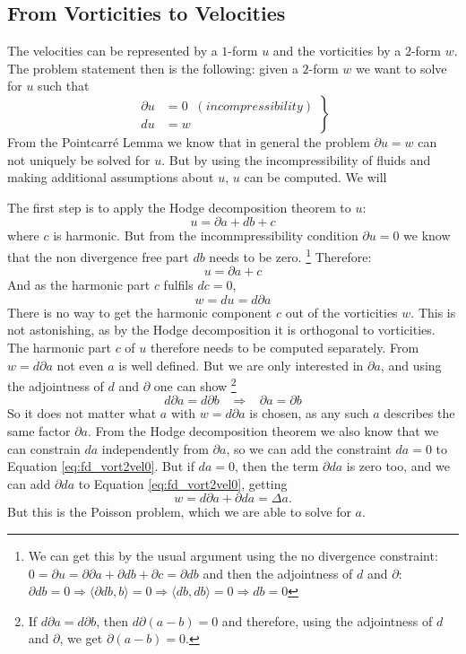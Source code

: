 \subsection{From Vorticities to Velocities}
\label{subsec:fd_vort2vel}
The velocities can be represented by a $1$-form $u$ and the vorticities by a $2$-form $w$.
 The problem statement then is the following: given a $2$-form $w$ we want to solve for $u$ such that
\begin{equation*}\left.\begin{aligned}\partial u &= 0 \;\; (incompressibility) \\ 
du &= w \end{aligned}\right\}\end{equation*}
From the Pointcarr\'e Lemma we know that   in general  the problem $\partial u = w$ can not uniquely be solved for $u$. But by using the incompressibility of fluids and making additional assumptions about $u$, $u$ can be computed. We will 

The first step is to apply the Hodge decomposition theorem to $u$:
\[u = \partial a + db + c \]
where $c$ is harmonic. But from the incommpressibility condition $\partial u = 0$ we know that the non divergence free part $db$ needs to be zero.\nobreak
%
\footnote{ We can get this by the usual argument using the no divergence constraint: $0 = \partial u = \partial \partial a + \partial db + \partial c = \partial d b$ and then the adjointness of $d$ and $\partial$: $\partial d b = 0 \Rightarrow \langle \partial d b , b \rangle = 0 \Rightarrow \langle db, db \rangle = 0 \Rightarrow db = 0 $}
%
Therefore: 
\[u = \partial a + c\]
And as the harmonic part $c$ fulfils $dc = 0$,
\begin{equation} w = du = d\partial a \label{eq:fd_vort2vel0}\end{equation}
There is no way to get the harmonic component $c$ out of the vorticities $w$. This is not astonishing, as by the Hodge decomposition it is orthogonal to vorticities. The harmonic part $c$ of $u$ therefore needs to be computed separately. From $w = d \partial a$ not even $a$ is well defined. But we are only interested in $\partial a$, and using the adjointness of $d$ and $\partial$ one can show\nobreak 
%
\footnote{If $ d \partial a = d \partial b$, then $d \partial (a- b) = 0$ and therefore, using the adjointness of $d$ and $\partial$, we get $\partial (a-b) = 0.$}
%
$$d \partial a = d \partial b \;\;\;\Rightarrow\;\;\; \partial a = \partial b$$
%
So it does not matter what $a$ with $w = d \partial a$ is chosen, as any such $a$ describes the same factor $\partial a$. From the Hodge decomposition theorem we also know that we can constrain $da$ independently from $\partial a$, so we can add the constraint $da = 0$ to Equation \ref{eq:fd_vort2vel0}. But if $da = 0$, then the term $\partial d a$ is zero too, and we can add $\partial d a$ to Equation \ref{eq:fd_vort2vel0}, getting
\begin{equation} w = d\partial a + \partial d a = \Delta a .\label{eq:fd_vort2vel}\end{equation}
But this is the Poisson problem, which we are able to solve for $a$.

